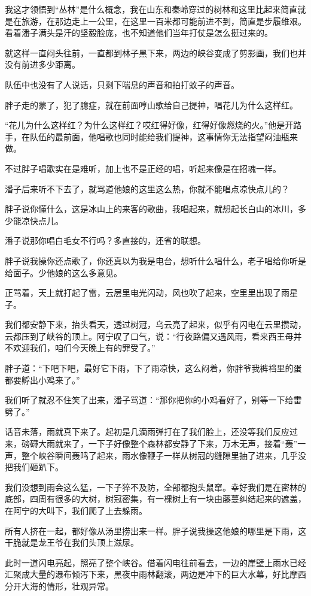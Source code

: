 我这才领悟到“丛林”是什么概念，我在山东和秦岭穿过的树林和这里比起来简直就是在旅游，在那边走上一公里，在这里一百米都可能前进不到，简直是步履维艰。看着潘子满头是汗的坚毅脸庞，也不知道他们当年打仗是怎么挺过来的。

就这样一直闷头往前，一直都到林子黑下来，两边的峡谷变成了剪影画，我们也并没有前进多少距离。

队伍中也没有了人说话，只剩下喘息的声音和拍打蚊子的声音。

胖子走的蒙了，犯了臆症，就在前面哼山歌给自己提神，唱花儿为什么这样红。

“花儿为什么这样红？为什么这样红？哎红得好像，红得好像燃烧的火。”他是开路手，在队伍的最前面，他唱歌也同时能给我们提神，这事情你无法指望闷油瓶来做。

不过胖子唱歌实在是难听，加上也不是正经的唱，听起来像是在招魂一样。

潘子后来听不下去了，就骂道他娘的这里这么热，你就不能唱点凉快点儿的？

胖子说你懂什么，这是冰山上的来客的歌曲，我唱起来，就想起长白山的冰川，多少能凉快点儿。

潘子说那你唱白毛女不行吗？多直接的，还省的联想。

胖子说我操你还点歌了，你还真以为我是电台，想听什么唱什么，老子唱给你听是给面子。少他娘的这么多意见。

正骂着，天上就打起了雷，云层里电光闪动，风也吹了起来，空里里出现了雨星子。

我们都安静下来，抬头看天，透过树冠，乌云亮了起来，似乎有闪电在云里攒动，云都压到了峡谷的顶上。阿宁叹了口气，说：“行夜路偏又遇风雨，看来西王母并不欢迎我们，咱们今天晚上有的罪受了。”

胖子道：“下吧下吧，最好它下雨，下了雨凉快，这么闷着，你胖爷我裤裆里的蛋都要孵出小鸡来了。”

我们听了就忍不住笑了出来，潘子骂道：“那你把你的小鸡看好了，别等一下给雷劈了。”

话音未落，雨就真下来了。起初是几滴雨弹打在了我们脸上，还没等我们反应过来，磅礴大雨就来了，一下子好像整个森林都安静了下来，万木无声，接着“轰”一声，整个峡谷瞬间轰鸣了起来，雨水像鞭子一样从树冠的缝隙里抽了进来，几乎没把我们砸趴下。

我们没想到雨会这么猛，一下子猝不及防，全部都抱头鼠窜。幸好我们是在密林的底部，四周有很多的大树，树冠密集，有一棵树上有一块由藤蔓纠结起来的遮盖，在阿宁的大叫下，我们爬了上去躲雨。

所有人挤在一起，都好像从汤里捞出来一样。胖子说我操这他娘的哪里是下雨，这干脆就是龙王爷在我们头顶上滋尿。

此时一道闪电亮起，照亮了整个峡谷。借着闪电往前看去，一边的崖壁上雨水已经汇聚成大量的瀑布倾泻下来，黑夜中雨林翻滚，两边是冲下的巨大水幕，好比摩西分开大海的情形，壮观异常。

